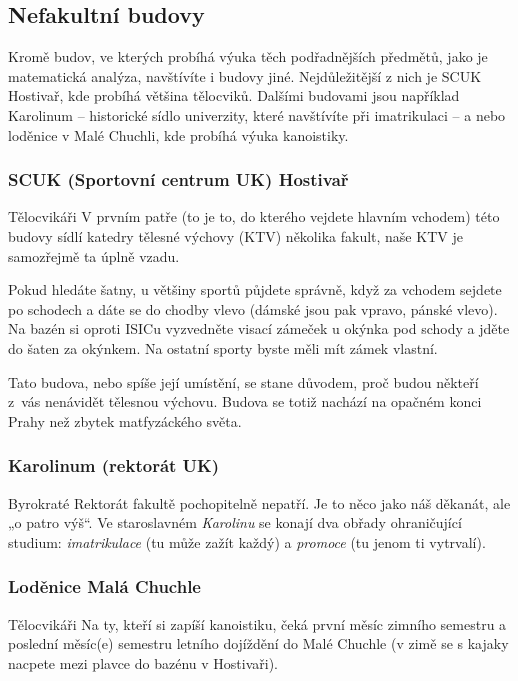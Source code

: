 \subsection{Nefakultní budovy}
Kromě budov, ve kterých probíhá výuka těch podřadnějších předmětů, jako je
matematická analýza, navštívíte i budovy jiné. Nejdůležitější z nich je SCUK
Hostivař, kde probíhá většina tělocviků. Dalšími budovami jsou například
Karolinum – historické sídlo univerzity, které navštívíte při imatrikulaci – a
nebo loděnice v Malé Chuchli, kde probíhá výuka kanoistiky.


\subsubsection{SCUK (Sportovní centrum UK) Hostivař}
{Tělocvikáři}
V prvním patře (to je to, do kterého vejdete hlavním vchodem) této budovy sídlí
katedry tělesné výchovy (KTV) několika fakult, naše KTV je samozřejmě ta úplně vzadu.

Pokud hledáte šatny, u většiny sportů půjdete správně, když za vchodem sejdete
po schodech a dáte se do chodby vlevo (dámské jsou pak vpravo, pánské vlevo). Na
bazén si oproti ISICu vyzvedněte visací zámeček u okýnka pod schody a jděte do
šaten za okýnkem. Na ostatní sporty byste měli mít zámek vlastní.

Tato budova, nebo spíše její umístění, se stane důvodem, proč budou někteří
z~vás nenávidět tělesnou výchovu. Budova se totiž nachází na opačném konci Prahy
než zbytek matfyzáckého světa.


\subsubsection{Karolinum (rektorát UK)}
{Byrokraté}
Rektorát fakultě pochopitelně nepatří. Je to něco jako náš děkanát, ale „o patro
výš“. Ve staroslavném \textit{Karolinu} se konají dva obřady ohraničující
studium: \textit{imatrikulace} (tu může zažít každý) a \textit{promoce} (tu
jenom ti vytrvalí).


\subsubsection{Loděnice Malá Chuchle}
{Tělocvikáři}
Na ty, kteří si zapíší kanoistiku, čeká první měsíc zimního semestru a poslední
měsíc(e) semestru letního dojíždění do Malé Chuchle (v zimě se s kajaky nacpete
mezi plavce do bazénu v Hostivaři).